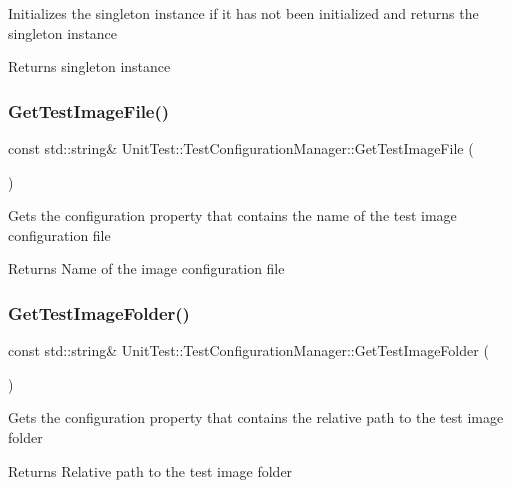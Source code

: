 Initializes the singleton instance if it has not been initialized and returns the singleton instance \begin{DoxyReturn}{Returns}
singleton instance 
\end{DoxyReturn}
\mbox{\label{class_unit_test_1_1_test_configuration_manager_a68bc437de34df3e796fc6fde731c4803}} 
\subsubsection{\texorpdfstring{GetTestImageFile()}{GetTestImageFile()}}
{\footnotesize\ttfamily const std\+::string\& Unit\+Test\+::\+Test\+Configuration\+Manager\+::\+Get\+Test\+Image\+File (\begin{DoxyParamCaption}{ }\end{DoxyParamCaption})\hspace{0.3cm}{\ttfamily [inline]}}

Gets the configuration property that contains the name of the test image configuration file \begin{DoxyReturn}{Returns}
Name of the image configuration file 
\end{DoxyReturn}
\mbox{\label{class_unit_test_1_1_test_configuration_manager_a246758c1638ac8a8966c7d0e8e02085b}} 
\subsubsection{\texorpdfstring{GetTestImageFolder()}{GetTestImageFolder()}}
{\footnotesize\ttfamily const std\+::string\& Unit\+Test\+::\+Test\+Configuration\+Manager\+::\+Get\+Test\+Image\+Folder (\begin{DoxyParamCaption}{ }\end{DoxyParamCaption})\hspace{0.3cm}{\ttfamily [inline]}}

Gets the configuration property that contains the relative path to the test image folder \begin{DoxyReturn}{Returns}
Relative path to the test image folder 
\end{DoxyReturn}
\mbox{\label{class_unit_test_1_1_test_configuration_manager_a9467f8835450de0622c9be41cf88ed79}} 
